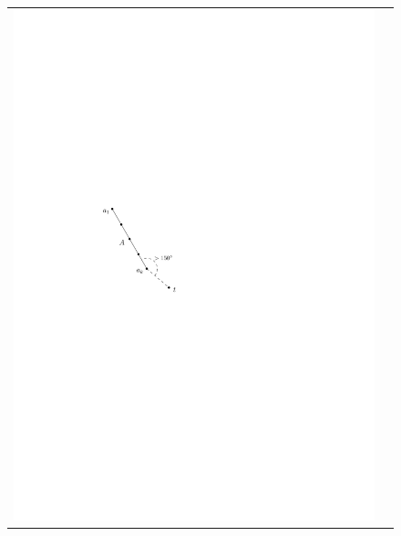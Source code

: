 \documentclass [letterpaper] {patmorin}
\begin{document}
\begin{figure}
  \begin{center}
    \begin{tabular}{cc}
      \includegraphics{pics/achain} &

\end{tabular}
\end{center}
\end{figure}
\end{document}
